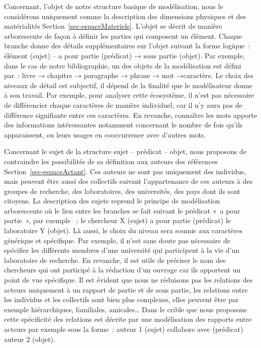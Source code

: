 \documentclass[
  a4paper,
  DIV=11,
  numbers=noendperiod]{scrreprt}
\begin{document}
Concernant, l'objet de notre structure basique de modélisation, nous le
considérons uniquement comme la description des dimensions physiques et
des matérialités Section~\ref{sec-espaceMateriels}. L'objet se décrit de
manière arborescente de façon à définir les parties qui composent un
élément. Chaque branche donne des détails supplémentaires sur l'objet
suivant la forme logique~: élément (sujet) -- a pour partie (prédicat) →
sous partie (objet). Par exemple, dans le cas de notre bibliographie, un
des objets de la modélisation est défini par~: livre → chapitre →
paragraphe → phrase → mot →caractère. Le choix des niveaux de détail est
subjectif, il dépend de la finalité que le modélisateur donne à son
travail. Par exemple, pour analyser cette écosystème, il n'est pas
nécessaire de différencier chaque caractères de manière individuel, car
il n'y aura pas de différence signifiante entre ces caractères. En
revanche, connaître les mots apporte des informations intéressantes
notamment concernant le nombre de fois qu'ils apparaissent, ou leurs
usages en cooccurrence avec d'autres mots.

Concernant le sujet de la structure sujet -- prédicat -- objet, nous
proposons de contraindre les possibilités de sa définition aux auteurs
des références Section~\ref{sec-espaceActant}. Ces auteurs ne sont pas
uniquement des individus, mais peuvent être aussi des collectifs suivant
l'appartenance de ces auteurs à des groupes de recherche, des
laboratoires, des universités, des pays dont ils sont citoyens. La
description des sujets reprend le principe de modélisation arborescente
où le lien entre les branches se fait suivant le prédicat «~a pour
partie~», par exemple ~: le chercheur X (sujet) a pour partie (prédicat)
le laboratoire Y (objet). Là aussi, le choix du niveau sera soumis aux
caractères générique et spécifique. Par exemple, il n'est sans doute pas
nécessaire de spécifier les différents membres d'une université qui
participent à la vie d'un laboratoire de recherche. En revanche, il est
utile de préciser le nom des chercheurs qui ont participé à la rédaction
d'un ouvrage car ils apportent un point de vue spécifique. Il est
évident que nous ne réduisons pas les relations des acteurs uniquement à
un rapport de partie et de sous partie, les relations entre les
individus et les collectifs sont bien plus complexes, elles peuvent être
par exemple hiérarchiques, familiales, amicales\ldots{} Dans le crible
que nous proposons cette spécificité des relations est décrite par une
modélisation des rapports entre acteurs par exemple sous la forme~:
auteur 1 (sujet) collabore avec (prédicat) auteur 2 (objet).
\end{document}
